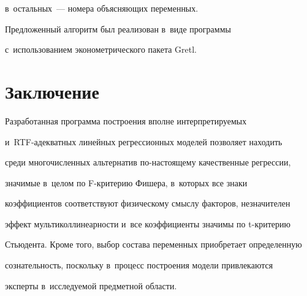 в~остальных~--- номера объясняющих переменных.


  


  Предложенный алгоритм был реализован в~виде программы 


с~использованием эконометрического пакета Gretl.


  


  \section{Заключение}


  


  Разработанная программа построения вполне интерпретируемых  


и~RTF-аде\-кват\-ных линейных регрессионных моделей позволяет находить 


среди многочисленных альтернатив по-настоящему качественные регрессии, 


значимые в~целом по F-кри\-те\-рию Фишера, в~которых все знаки 


коэффициентов соответствуют физическому смыслу факторов, незначителен 


эффект мультиколлинеарности и~все коэффициенты значимы по t-кри\-те\-рию 


Стьюдента. Кроме того, выбор состава переменных приобретает определенную 


сознательность, поскольку в~процесс построения модели привлекаются 


эксперты в~исследуемой предметной об\-ласти.


  


